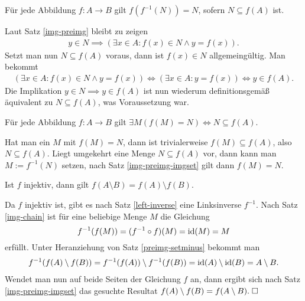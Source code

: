 \begin{Satz}\label{img-preimg-imgset}
Für jede Abbildung $f\colon A\to B$ gilt $f(f^{-1}(N))=N$,
sofern $N\subseteq f(A)$ ist.
\end{Satz}
\begin{Beweis}
Laut Satz \ref{img-preimg} bleibt zu zeigen
\begin{gather*}
y\in N\implies (\exists x\in A\colon f(x)\in N\land y=f(x)).
\end{gather*}
Setzt man nun $N\subseteq f(A)$ voraus, dann ist $f(x)\in N$
allgemeingültig. Man bekommt
\begin{gather*}
(\exists x\in A\colon f(x)\in N\land y=f(x))
\iff (\exists x\in A\colon y=f(x))\iff y\in f(A).
\end{gather*}
Die Implikation $y\in N\implies y\in f(A)$ ist nun
wiederum definitionsgemäß äquivalent zu $N\subseteq f(A)$,
was Voraussetzung war.\;\qedsymbol
\end{Beweis}

\begin{Satz}
Für jede Abbildung $f\colon A\to B$ gilt
$\exists M(f(M)=N)\iff N\subseteq f(A)$.
\end{Satz}
\begin{Beweis}
Hat man ein $M$ mit $f(M)=N$, dann ist trivialerweise
$f(M)\subseteq f(A)$, also $N\subseteq f(A)$. Liegt umgekehrt
eine Menge $N\subseteq f(A)$ vor, dann kann man $M:=f^{-1}(N)$
setzen, nach Satz \ref{img-preimg-imgset} gilt dann $f(M)=N$.\;\qedsymbol
\end{Beweis}

\begin{Satz}\label{inj-img-setminus}
Ist $f$ injektiv, dann gilt $f(A\setminus B)=f(A)\setminus f(B)$.
\end{Satz}
\begin{Beweis}
Da $f$ injektiv ist, gibt es nach Satz \ref{left-inverse} eine
Linksinverse $f^{-1}$. Nach Satz \ref{img-chain} ist für eine
beliebige Menge $M$ die Gleichung
\[f^{-1}(f(M)) = (f^{-1}\circ f)(M) = \operatorname{id}(M) = M\]
erfüllt. Unter Heranziehung von Satz \ref{preimg-setminus}
bekommt man
\begin{gather*}
f^{-1}(f(A)\setminus f(B)) = f^{-1}(f(A))\setminus f^{-1}(f(B))
= \operatorname{id}(A)\setminus\operatorname{id}(B) = A\setminus B.
\end{gather*}
Wendet man nun auf beide Seiten der Gleichung $f$ an, dann ergibt
sich nach Satz \ref{img-preimg-imgset} das gesuchte Resultat
$f(A)\setminus f(B) = f(A\setminus B).\;\square$
\end{Beweis}

